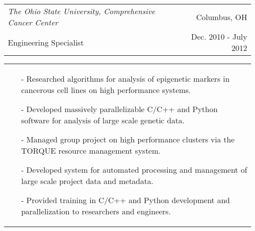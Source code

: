 \begin{tabularx}{\textwidth}{ L R }
  \textit{The Ohio State University, Comprehensive Cancer Center} & Columbus, OH \\
  Engineering Specialist & Dec. 2010 - July 2012 \\
\end{tabularx}
\begin{tabularx}{\textwidth}{ X }
  \begin{itemize}
    \itemsep{}
    \item[-] Researched algorithms for analysis of epigenetic markers in cancerous cell lines on high performance systems.
    \item[-] Developed massively parallelizable C/C++ and Python software for analysis of large scale genetic data.
    \item[-] Managed group project on high performance clusters via the TORQUE resource management system.
    \item[-] Developed system for automated processing and management of large scale project data and metadata.
    \item[-] Provided training in C/C++ and Python development and parallelization to researchers and engineers.
  \end{itemize}
\end{tabularx}
